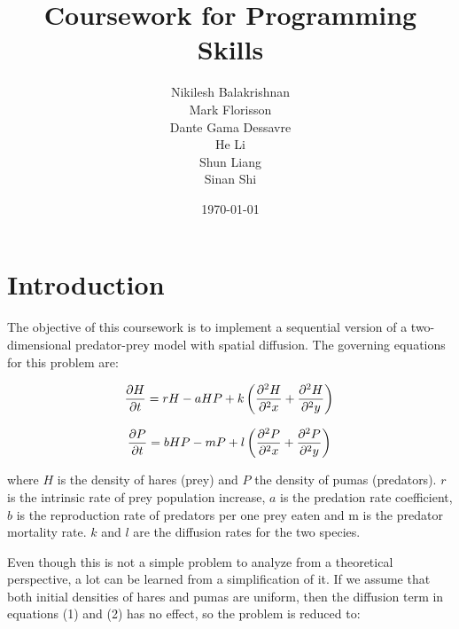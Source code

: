 \documentclass[12pt,a4paper]{article}
\begin{document}
\title{Coursework for Programming Skills}
\author{Nikilesh Balakrishnan\\
        Mark Florisson\\
        Dante Gama Dessavre\\
        He Li\\
        Shun Liang\\
        Sinan Shi}
\date{\today}

\makeEPCCtitle

\thispagestyle{empty}

\newpage


\tableofcontents

\newpage


\section{Introduction}

The objective of this coursework is to implement a sequential version of a two-dimensional predator-prey model with spatial diffusion. The governing equations for this problem are:

\begin{equation}
\frac{\partial H}{\partial t}=rH-aHP+k\left(\frac{\partial^2 H}{\partial^2 x}+\frac{\partial^2 H}{\partial^2 y}\right)\\
\end{equation}

\begin{equation}
\frac{\partial P}{\partial t}=bHP-mP+l\left(\frac{\partial^2 P}{\partial^2 x}+\frac{\partial^2 P}{\partial^2 y}\right)\\
\end{equation}

where $H$ is the density of hares (prey) and $P$ the density of pumas (predators). $r$ is the intrinsic rate of prey population increase, $a$ is the predation rate coefficient, $b$ is the reproduction rate of predators per one prey eaten and m is the predator mortality rate. $k$ and $l$ are the diffusion rates for the two species.

Even though this is not a simple problem to analyze from a theoretical perspective, a lot can be learned from a simplification of it. If we assume that both initial densities of hares and pumas are uniform, then the diffusion term in equations (1) and (2) has no effect, so the problem is reduced to:
\end{document}
